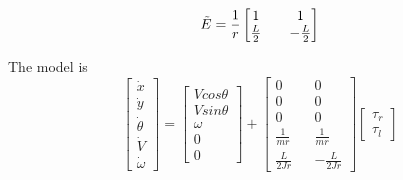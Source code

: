 \[\Tilde{E}=\frac{1}{r}\begin{bmatrix}
1 && 1 \\
\frac{L}{2} && -\frac{L}{2} \\ 
\end{bmatrix}\]

The model is
\begin{equation}
\begin{bmatrix}
\Dot{x}\\
\Dot{y}\\
\Dot{\theta}\\
\Dot{V}\\
\Dot{\omega}
\end{bmatrix}=
\begin{bmatrix}
V cos\theta\\
V sin\theta\\
\omega\\
0\\
0
\end{bmatrix}+
\begin{bmatrix}
0&& 0 \\
0&& 0 \\
0&& 0 \\
\frac{1}{mr}&& \frac{1}{mr} \\
\frac{L}{2Jr}&&-\frac{L}{2Jr}
\end{bmatrix}\begin{bmatrix}
\tau_r\\
\tau_l
\end{bmatrix}
\end{equation}

